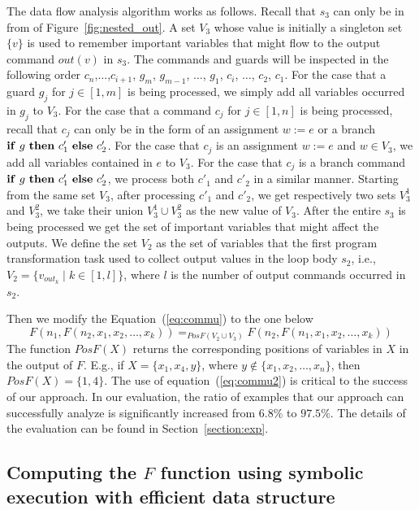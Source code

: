 \documentclass{llncs}
\newcommand{\ite}[3]{
	 \ifmmode 
	 \mathbf{if}\ #1 \ \mathbf{then}\ #2\  \mathbf{else}\ #3 
	 \else
	 \textbf{if}\ #1 \ \textbf{then}\ #2\  \textbf{else}\ #3
	 \fi}
\begin{document}
The data flow analysis algorithm works as follows. Recall that $s_3$ can only be in from of Figure~\ref{fig:nested_out}.
A set $V_3$ whose value is initially a singleton set $\{v\}$ is used to remember important variables that might flow to the output command $out(v)$ in $s_3$.
The commands and guards will be inspected in the following order $c_{n}$,$\ldots$,$c_{i+1}$, $g_m$, $g_{m-1}$, $\ldots$, $g_1$, $c_i$, $\ldots$, $c_2$, $c_1$. For the case that a guard $g_j$ for $j\in [1,m]$ is being processed, we simply add all variables occurred in $g_j$ to $V_3$. 
For the case that a command $c_j$ for $j\in [1,n]$ is being processed, 
recall that $c_j$ can only be in the form of an assignment $w:=e$ or a branch $\ite{g}{c'_1}{c'_2}$.
For the case that $c_j$ is an assignment $w:=e$ and $w\in V_3$, we add all variables contained in $e$ to $V_3$. For the case that $c_j$ is a branch command $\ite{g}{c'_1}{c'_2}$, we process both $c'_1$ and $c'_2$ in a similar manner. Starting from the same set $V_3$,  after processing $c'_1$ and $c'_2$, we get respectively two sets $V_3^1$ and $V_3^2$, we take their union $V_3^1\cup V_3^2$ as the new value of $V_3$. After the entire $s_3$ is being processed we get the set of important variables that might affect the outputs.
We define the set $V_2$ as the set of variables that the first program transformation task used to collect output values in the loop body $s_2$, i.e., $V_2= \{v_{out_k} \mid k \in [1,l]\}$, where $l$ is the number of output commands occurred in $s_2$.

Then we modify the Equation~(\ref{eq:commu}) to the one below
\begin{equation}
F(n_1, F(n_2,x_1,x_2,\ldots,x_k) )=_{PosF(V_2\cup V_3)} F(n_2, F(n_1,x_1,x_2,\ldots,x_k) )
\label{eq:commu2}
\end{equation}
The function $PosF(X)$ returns the corresponding positions of variables in $X$ in the output of $F$. E.g., if $X = \{x_1,x_4,y\}$, where $y\notin \{x_1,x_2,\ldots,x_n\}$, then $PosF(X)=\{1,4\}$.
The use of equation~(\ref{eq:commu2}) is critical to the success of our approach. In our evaluation, the ratio of examples that our approach can successfully analyze is significantly increased from $6.8\%$ to $97.5\%$. The details of the evaluation can be found in Section~\ref{section:exp}.

\subsection{Computing the $F$ function using symbolic execution with efficient data structure}
\label{section:opt2}
\end{document}
